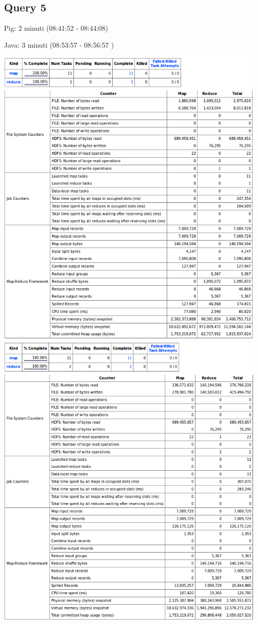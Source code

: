 \documentclass[11pt]{article} %
\begin{document}
\subsection{Query 5}
Pig:  2 minuti	(08:41:52 - 08:44:08)

Java: 3 minuti	(08:53:57 - 08:56:57 )

\includegraphics[scale=0.8]{pig5.png}
\includegraphics[scale=0.8]{java5.png}
\end{document}
